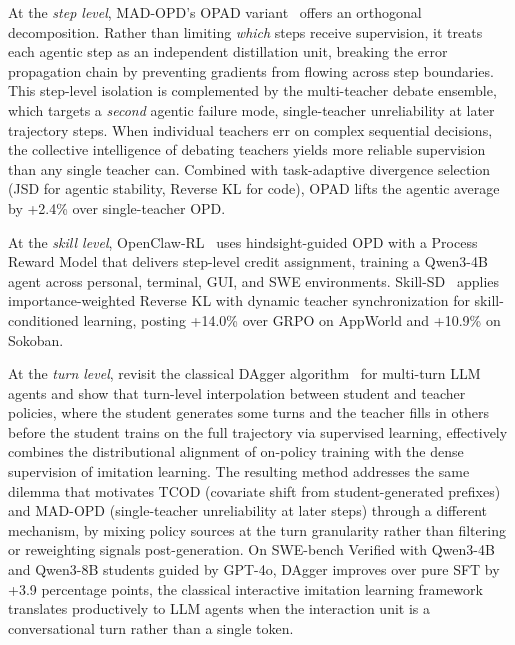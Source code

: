\documentclass{article} %
\begin{document}
At the \emph{step level}, MAD-OPD's OPAD variant~\citep{2605.01347} offers an orthogonal decomposition. Rather than limiting \emph{which} steps receive supervision, it treats each agentic step as an independent distillation unit, breaking the error propagation chain by preventing gradients from flowing across step boundaries. This step-level isolation is complemented by the multi-teacher debate ensemble, which targets a \emph{second} agentic failure mode, single-teacher unreliability at later trajectory steps. When individual teachers err on complex sequential decisions, the collective intelligence of debating teachers yields more reliable supervision than any single teacher can. Combined with task-adaptive divergence selection (JSD for agentic stability, Reverse KL for code), OPAD lifts the agentic average by +2.4\% over single-teacher OPD.

At the \emph{skill level}, OpenClaw-RL~\citep{2603.10165} uses hindsight-guided OPD with a Process Reward Model that delivers step-level credit assignment, training a Qwen3-4B agent across personal, terminal, GUI, and SWE environments. Skill-SD~\citep{2604.10674} applies importance-weighted Reverse KL with dynamic teacher synchronization for skill-conditioned learning, posting +14.0\% over GRPO on AppWorld and +10.9\% on Sokoban.

At the \emph{turn level}, \citet{2605.12913} revisit the classical DAgger algorithm~\citep{1011.0686} for multi-turn LLM agents and show that turn-level interpolation between student and teacher policies, where the student generates some turns and the teacher fills in others before the student trains on the full trajectory via supervised learning, effectively combines the distributional alignment of on-policy training with the dense supervision of imitation learning. The resulting method addresses the same dilemma that motivates TCOD (covariate shift from student-generated prefixes) and MAD-OPD (single-teacher unreliability at later steps) through a different mechanism, by mixing policy sources at the turn granularity rather than filtering or reweighting signals post-generation. On SWE-bench Verified with Qwen3-4B and Qwen3-8B students guided by GPT-4o, DAgger improves over pure SFT by +3.9 percentage points, the classical interactive imitation learning framework translates productively to LLM agents when the interaction unit is a conversational turn rather than a single token.
\end{document}
